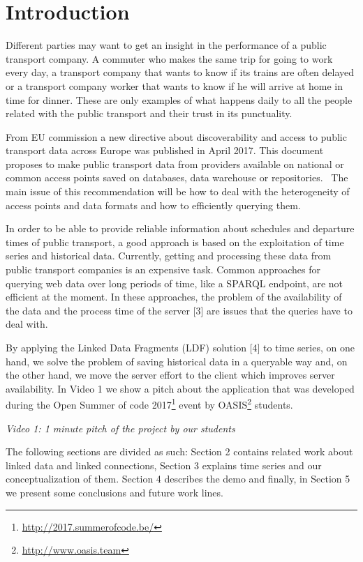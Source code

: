\documentclass[runningheads,a4paper]{llncs}
\begin{document}
\section{Introduction}

Different parties may want to get an insight in the performance of a public transport company. A commuter who makes the same trip for going to work every day, a transport company that wants to know if its trains are often delayed or a transport company worker that wants to know if he will arrive at home in time for dinner. These are only examples of what happens daily to all the people related with the public transport and their trust in its punctuality. 

From EU commission a new directive about discoverability and access to public transport data across Europe was published in April 2017. This document proposes to make public transport data from providers available on national or common access points saved on databases, data warehouse or repositories.  The main issue of this recommendation will be how to deal with the heterogeneity of access points and data formats and how to efficiently querying them.

In order to be able to provide reliable information about schedules and departure times of public transport, a good approach is based on the exploitation of time series and historical data. Currently, getting and processing these data from public transport companies is an expensive task. Common approaches for querying web data over long periods of time, like a SPARQL endpoint, are not efficient at the moment. In these approaches, the problem of the availability of the data and the process time of the server [3] are issues that the queries have to deal with. 

By applying the Linked Data Fragments (LDF) solution [4] to time series, on one hand, we solve the problem of saving historical data in a queryable way and, on the other hand, we move the server effort to the client which improves server availability. In Video 1 we show a pitch about the application that was developed during the Open Summer of code 2017\footnote{\url{http://2017.summerofcode.be/}} event by OASIS\footnote{\url{http://www.oasis.team}} students. 

{\em Video 1: 1 minute pitch of the project by our students}

The following sections are divided as such: Section 2 contains related work about linked data and linked connections, Section 3 explains time series and our conceptualization of them. Section 4 describes the demo and finally, in Section 5 we present some conclusions and future work lines.
\end{document}
